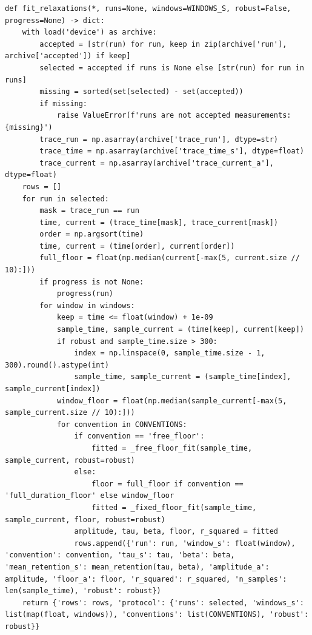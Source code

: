 \documentclass[a4paper,10pt]{article}
\begin{document}
\begin{Verbatim}
def fit_relaxations(*, runs=None, windows=WINDOWS_S, robust=False, progress=None) -> dict:
    with load('device') as archive:
        accepted = [str(run) for run, keep in zip(archive['run'], archive['accepted']) if keep]
        selected = accepted if runs is None else [str(run) for run in runs]
        missing = sorted(set(selected) - set(accepted))
        if missing:
            raise ValueError(f'runs are not accepted measurements: {missing}')
        trace_run = np.asarray(archive['trace_run'], dtype=str)
        trace_time = np.asarray(archive['trace_time_s'], dtype=float)
        trace_current = np.asarray(archive['trace_current_a'], dtype=float)
    rows = []
    for run in selected:
        mask = trace_run == run
        time, current = (trace_time[mask], trace_current[mask])
        order = np.argsort(time)
        time, current = (time[order], current[order])
        full_floor = float(np.median(current[-max(5, current.size // 10):]))
        if progress is not None:
            progress(run)
        for window in windows:
            keep = time <= float(window) + 1e-09
            sample_time, sample_current = (time[keep], current[keep])
            if robust and sample_time.size > 300:
                index = np.linspace(0, sample_time.size - 1, 300).round().astype(int)
                sample_time, sample_current = (sample_time[index], sample_current[index])
            window_floor = float(np.median(sample_current[-max(5, sample_current.size // 10):]))
            for convention in CONVENTIONS:
                if convention == 'free_floor':
                    fitted = _free_floor_fit(sample_time, sample_current, robust=robust)
                else:
                    floor = full_floor if convention == 'full_duration_floor' else window_floor
                    fitted = _fixed_floor_fit(sample_time, sample_current, floor, robust=robust)
                amplitude, tau, beta, floor, r_squared = fitted
                rows.append({'run': run, 'window_s': float(window), 'convention': convention, 'tau_s': tau, 'beta': beta, 'mean_retention_s': mean_retention(tau, beta), 'amplitude_a': amplitude, 'floor_a': floor, 'r_squared': r_squared, 'n_samples': len(sample_time), 'robust': robust})
    return {'rows': rows, 'protocol': {'runs': selected, 'windows_s': list(map(float, windows)), 'conventions': list(CONVENTIONS), 'robust': robust}}
\end{Verbatim}
\end{document}
